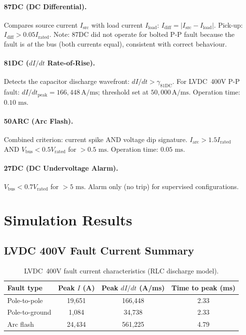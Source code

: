 \documentclass[11pt, a4paper]{article}
\newcommand{\ms}{\,\text{ms}}
\begin{document}
\paragraph{87DC (DC Differential).}
Compares source current $I_{\mathrm{src}}$ with load current $I_{\mathrm{load}}$:
$I_{\mathrm{diff}} = |I_{\mathrm{src}} - I_{\mathrm{load}}|$.
Pick-up: $I_{\mathrm{diff}} > 0.05 I_{\mathrm{rated}}$.
Note: 87DC did not operate for bolted P-P fault because the fault is
\emph{at} the bus (both currents equal), consistent with correct behaviour.

\paragraph{81DC ($dI/dt$ Rate-of-Rise).}
Detects the capacitor discharge wavefront:
$dI/dt > \gamma_{\mathrm{81DC}}$.
For LVDC~400V P-P fault: $dI/dt_{\mathrm{peak}} = 166{,}448\,\text{A/ms}$;
threshold set at $50{,}000\,\text{A/ms}$.
Operation time: $0.10\,\ms$.

\paragraph{50ARC (Arc Flash).}
Combined criterion: current spike AND voltage dip signature.
$I_{\mathrm{arc}} > 1.5 I_{\mathrm{rated}}$ AND
$V_{\mathrm{bus}} < 0.5 V_{\mathrm{rated}}$ for $> 0.5\,\ms$.
Operation time: $0.05\,\ms$.

\paragraph{27DC (DC Undervoltage Alarm).}
$V_{\mathrm{bus}} < 0.7 V_{\mathrm{rated}}$ for $> 5\,\ms$.
Alarm only (no trip) for supervised configurations.

\section{Simulation Results}
\label{sec:results}

\subsection{LVDC 400V Fault Current Summary}

\begin{table}[ht]
\centering
\caption{LVDC~400V fault current characteristics (RLC discharge model).}
\label{tab:lvdc}
\begin{tabular}{lccc}
\toprule
Fault type & Peak $I$ (A) & Peak $dI/dt$ (A/ms) & Time to peak (ms) \\
\midrule
Pole-to-pole & 19{,}651 & 166{,}448 & 2.33 \\
Pole-to-ground & 1{,}084 & 34{,}738 & 2.33 \\
Arc flash      & 24{,}434 & 561{,}225 & 4.79 \\
\bottomrule
\end{tabular}
\end{table}
\end{document}
